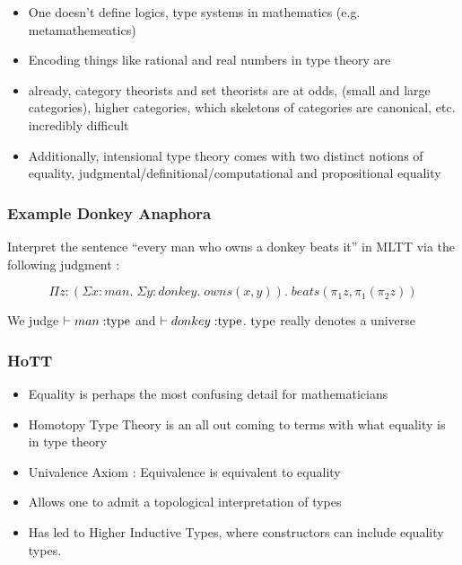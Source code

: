 \documentclass[10pt]{beamer}
\begin{document}
\begin{frame}

\begin{itemize}
\item One doesn't define logics, type systems in mathematics (e.g. metamathemeatics)
\item Encoding things like rational and real numbers in type theory are
\item already, category theorists and set theorists are at odds, (small and
  large categories), higher categories, which skeletons of categories are canonical, etc.
  incredibly difficult
\item Additionally, intensional type theory comes with two distinct notions of
  equality, judgmental/definitional/computational and propositional equality
\end{itemize}
\end{frame}

\begin{frame}

\frametitle{Example Donkey Anaphora}

Interpret the sentence ``every man who owns a donkey beats it'' in MLTT via the following judgment :

\[\Pi z : (\Sigma x : man. \; \Sigma y : donkey. \; owns(x,y)). \;
  beats(\pi_1z,\pi_1(\pi_2z))\]

We judge $\vdash man \; {:} {\rm type}$ and $\vdash donkey \; {:}
{\rm type}$. ${\rm type}$ really denotes a universe

\end{frame}

\begin{frame}
\frametitle{HoTT}

\begin{itemize}
  \item Equality is perhaps the most confusing detail for mathematicians
  \item Homotopy Type Theory is an all out coming to terms with what equality is
    in type theory
  \item Univalence Axiom : Equivalence is equivalent to equality
  \item Allows one to admit a topological interpretation of types
  \item Has led to Higher Inductive Types, where constructors can include
    equality types.  
    
\end{itemize}
\end{frame}
\end{document}
